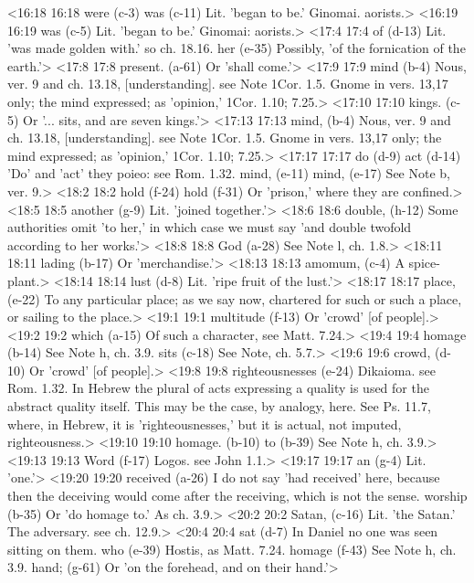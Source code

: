 <16:18 16:18  were (c-3)  was (c-11)
  Lit. 'began to be.' Ginomai. aorists.>
<16:19 16:19  was (c-5)  Lit. 'began to be.' Ginomai: aorists.>
<17:4 17:4  of (d-13)  Lit. 'was made golden with.' so ch. 18.16.
  her (e-35)  Possibly, 'of the fornication of the earth.'>
<17:8 17:8  present. (a-61)  Or 'shall come.'>
<17:9 17:9  mind (b-4)  Nous, ver. 9 and ch. 13.18, [understanding]. see Note 1Cor. 1.5.  Gnome in vers. 13,17 only; the mind expressed; as  'opinion,' 1Cor. 1.10; 7.25.>
<17:10 17:10  kings. (c-5)  Or '... sits, and are seven kings.'>
<17:13 17:13  mind, (b-4)  Nous, ver. 9 and ch. 13.18, [understanding]. see Note 1Cor. 1.5.  Gnome in vers. 13,17 only; the mind expressed; as  'opinion,' 1Cor. 1.10; 7.25.>
<17:17 17:17  do (d-9)  act (d-14)
  'Do' and 'act' they poieo: see Rom. 1.32.
  mind, (e-11)  mind, (e-17)
  See Note b, ver. 9.>
<18:2 18:2  hold (f-24)  hold (f-31)
  Or 'prison,' where they are confined.>
<18:5 18:5  another (g-9)  Lit. 'joined together.'>
<18:6 18:6  double, (h-12)  Some authorities omit 'to her,' in which case we must say  'and double twofold according to her works.'>
<18:8 18:8  God (a-28)  See Note l, ch. 1.8.>
<18:11 18:11  lading (b-17)  Or 'merchandise.'>
<18:13 18:13  amomum, (c-4)  A spice-plant.>
<18:14 18:14  lust (d-8)  Lit. 'ripe fruit of the lust.'>
<18:17 18:17  place, (e-22)  To any particular place; as we say now, chartered for such or  such a place, or sailing to the place.>
<19:1 19:1  multitude (f-13)  Or 'crowd' [of people].>
<19:2 19:2  which (a-15)  Of such a character, see Matt. 7.24.>
<19:4 19:4  homage (b-14) See Note h, ch. 3.9.
  sits (c-18)  See Note, ch. 5.7.>
<19:6 19:6  crowd, (d-10)  Or 'crowd' [of people].>
<19:8 19:8  righteousnesses (e-24)  Dikaioma. see Rom. 1.32. In Hebrew the plural of acts  expressing a quality is used for the abstract quality itself.  This may be the case, by analogy, here. See Ps. 11.7, where, in  Hebrew, it is 'righteousnesses,' but it is actual, not imputed,  righteousness.>
<19:10 19:10  homage. (b-10)  to (b-39)
  See Note h, ch. 3.9.>
<19:13 19:13  Word (f-17)  Logos. see John 1.1.>
<19:17 19:17  an (g-4)  Lit. 'one.'>
<19:20 19:20  received (a-26)  I do not say 'had received' here, because then the deceiving  would come after the receiving, which is not the sense.
  worship (b-35)  Or 'do homage to.' As ch. 3.9.>
<20:2 20:2  Satan, (c-16)  Lit. 'the Satan.' The adversary. see ch. 12.9.>
<20:4 20:4  sat (d-7)  In Daniel no one was seen sitting on them.
  who (e-39)  Hostis, as Matt. 7.24.
  homage (f-43)  See Note h, ch. 3.9.
  hand; (g-61)  Or 'on the forehead, and on their hand.'>

